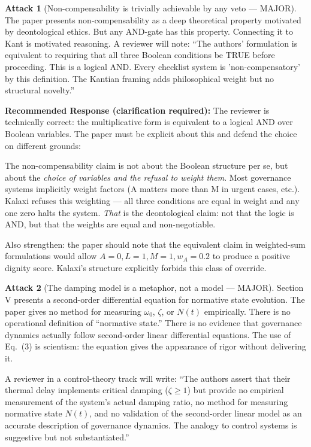 \documentclass[12pt,a4paper]{article}
\theoremstyle{definition}
\newtheorem{attack}{Attack}[section]
\begin{document}
\begin{attack}[Non-compensability is trivially achievable by any veto — MAJOR]
\label{att:veto}
The paper presents non-compensability as a deep theoretical property motivated by
deontological ethics. But any AND-gate has this property. Connecting it to Kant is
motivated reasoning. A reviewer will note: ``The authors' formulation is equivalent
to requiring that all three Boolean conditions be TRUE before proceeding. This is
a logical AND. Every checklist system is 'non-compensatory' by this definition.
The Kantian framing adds philosophical weight but no structural novelty.''
\end{attack}

\begin{mdframed}[style=defenseframe]
\textbf{Recommended Response (clarification required):}
The reviewer is technically correct: the multiplicative form is equivalent to a
logical AND over Boolean variables. The paper must be explicit about this and
defend the choice on different grounds:

The non-compensability claim is not about the Boolean structure per se, but about
the \emph{choice of variables and the refusal to weight them}. Most governance
systems implicitly weight factors (A matters more than M in urgent cases, etc.).
Kalaxi refuses this weighting — all three conditions are equal in weight and any
one zero halts the system. \emph{That} is the deontological claim: not that the
logic is AND, but that the weights are equal and non-negotiable.

Also strengthen: the paper should note that the equivalent claim in weighted-sum
formulations would allow $A = 0, L = 1, M = 1, w_A = 0.2$ to produce a positive
dignity score. Kalaxi's structure explicitly forbids this class of override.
\end{mdframed}

\begin{attack}[The damping model is a metaphor, not a model — MAJOR]
\label{att:dampingmetaphor}
Section V presents a second-order differential equation for normative state evolution.
The paper gives no method for measuring $\omega_0$, $\zeta$, or $N(t)$ empirically.
There is no operational definition of ``normative state.'' There is no evidence that
governance dynamics actually follow second-order linear differential equations. The
use of Eq.~(3) is scientism: the equation gives the appearance of rigor without
delivering it.

A reviewer in a control-theory track will write: ``The authors assert that their
thermal delay implements critical damping ($\zeta \geq 1$) but provide no empirical
measurement of the system's actual damping ratio, no method for measuring normative
state $N(t)$, and no validation of the second-order linear model as an accurate
description of governance dynamics. The analogy to control systems is suggestive
but not substantiated.''
\end{attack}
\end{document}
